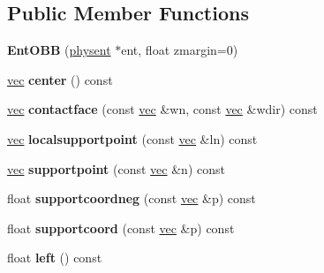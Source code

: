 \subsection*{Public Member Functions}
\begin{DoxyCompactItemize}
\item 
\mbox{\label{structmpr_1_1_ent_o_b_b_aed2893ddefe67a255f5a26e8b3d86028}} 
{\bfseries Ent\+O\+BB} (\hyperlink{structphysent}{physent} $\ast$ent, float zmargin=0)
\item 
\mbox{\label{structmpr_1_1_ent_o_b_b_ac86bbb813403c6e159b6fd7da871657d}} 
\hyperlink{structvec}{vec} {\bfseries center} () const
\item 
\mbox{\label{structmpr_1_1_ent_o_b_b_a4ae856b7375a46fd9d9ad1a5343f5129}} 
\hyperlink{structvec}{vec} {\bfseries contactface} (const \hyperlink{structvec}{vec} \&wn, const \hyperlink{structvec}{vec} \&wdir) const
\item 
\mbox{\label{structmpr_1_1_ent_o_b_b_aa99c23096cf193cfbb948692374e471f}} 
\hyperlink{structvec}{vec} {\bfseries localsupportpoint} (const \hyperlink{structvec}{vec} \&ln) const
\item 
\mbox{\label{structmpr_1_1_ent_o_b_b_a7cf0951be22d8575c1ce31d128277da6}} 
\hyperlink{structvec}{vec} {\bfseries supportpoint} (const \hyperlink{structvec}{vec} \&n) const
\item 
\mbox{\label{structmpr_1_1_ent_o_b_b_a5c4903b931c11da7508139cbf37d44a3}} 
float {\bfseries supportcoordneg} (const \hyperlink{structvec}{vec} \&p) const
\item 
\mbox{\label{structmpr_1_1_ent_o_b_b_a0afb00399c16cc28505819f97a7d297f}} 
float {\bfseries supportcoord} (const \hyperlink{structvec}{vec} \&p) const
\item 
\mbox{\label{structmpr_1_1_ent_o_b_b_ab0e912a5d16f063eabcf99138810c6cb}} 
float {\bfseries left} () const
\item 
\mbox{\label{structmpr_1_1_ent_o_b_b_a66d8f4e1d6ca76960be391060d7383e7}} 

\end{DoxyCompactItemize}
